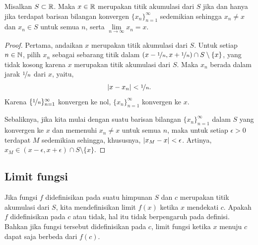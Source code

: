 \begin{prop}
Misalkan $S \subset {\mathbb{R}}$.  Maka $x \in {\mathbb{R}}$ merupakan titik akumulasi dari $S$
jika dan hanya jika
terdapat barisan bilangan konvergen $\{ x_n \}_{n=1}^\infty$ sedemikian sehingga
$x_n \neq x$ dan $x_n \in S$ untuk semua $n$, serta $\lim\limits_{n\to\infty} x_n = x$.
\end{prop}

\begin{proof}
Pertama, andaikan $x$ merupakan titik akumulasi dari $S$.
Untuk setiap $n \in {\mathbb{N}}$, pilih $x_n$ sebagai sebarang titik dalam
$(x-\nicefrac{1}{n},x+\nicefrac{1}{n}) \cap S \setminus \{x\}$, yang
tidak kosong karena $x$ merupakan titik akumulasi dari $S$.
Maka
$x_n$ berada dalam jarak $\nicefrac{1}{n}$ dari $x$, yaitu,
\begin{equation*}
\sabs{x-x_n} < \nicefrac{1}{n} .
\avoidbreak
\end{equation*}
Karena $\{ \nicefrac{1}{n} \}_{n=1}^\infty$ konvergen ke nol,
$\{ x_n \}_{n=1}^\infty$ konvergen ke $x$.

Sebaliknya, jika kita mulai dengan suatu barisan bilangan
$\{ x_n \}_{n=1}^\infty$ dalam $S$
yang konvergen ke $x$ dan memenuhi $x_n \neq x$ untuk semua $n$, maka untuk setiap
$\epsilon > 0$ terdapat $M$ sedemikian sehingga, khususnya, $\lvert {x_M - x} \rvert <
\epsilon$.  Artinya, $x_M \in (x-\epsilon,x+\epsilon) \cap S \setminus \{x\}$.
\end{proof}

\subsection{Limit fungsi}

Jika fungsi $f$ didefinisikan pada suatu himpunan $S$ dan $c$ merupakan titik akumulasi dari $S$,
kita mendefinisikan limit $f(x)$ ketika $x$ mendekati $c$.
Apakah $f$ didefinisikan pada $c$ atau tidak, hal itu tidak berpengaruh pada definisi.
Bahkan jika fungsi tersebut didefinisikan pada $c$, limit
fungsi ketika $x$ menuju $c$ dapat saja berbeda
dari $f(c)$.

